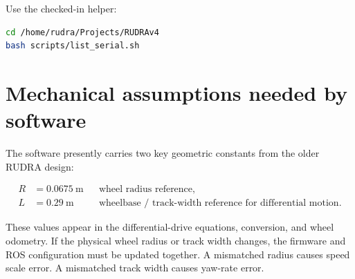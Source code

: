Use the checked-in helper:

\begin{lstlisting}[language=bash]
cd /home/rudra/Projects/RUDRAv4
bash scripts/list_serial.sh
\end{lstlisting}

\section{Mechanical assumptions needed by software}

The software presently carries two key geometric constants from the older RUDRA design:

\begin{align}
R &= 0.0675\ \text{m} && \text{wheel radius reference},\\
L &= 0.29\ \text{m} && \text{wheelbase / track-width reference for differential motion}.
\end{align}

These values appear in the differential-drive equations,  conversion, and wheel odometry. If the physical wheel radius or track width changes, the firmware and ROS configuration must be updated together. A mismatched radius causes speed scale error. A mismatched track width causes yaw-rate error.
